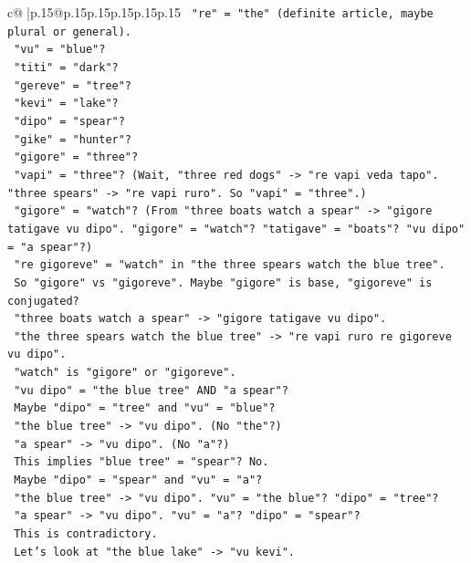 \documentclass{article}
\begin{document}
{\begin{supertabular}{c@{$\;$}|p{.15\linewidth}@{}p{.15\linewidth}p{.15\linewidth}p{.15\linewidth}p{.15\linewidth}p{.15\linewidth}}
{{{\texttt{    "re" = "the" (definite article, maybe plural or general).} \\
\texttt{    "vu" = "blue"?} \\
\texttt{    "titi" = "dark"?} \\
\texttt{    "gereve" = "tree"?} \\
\texttt{    "kevi" = "lake"?} \\
\texttt{    "dipo" = "spear"?} \\
\texttt{    "gike" = "hunter"?} \\
\texttt{    "gigore" = "three"?} \\
\texttt{    "vapi" = "three"? (Wait, "three red dogs" {-}> "re vapi veda tapo". "three spears" {-}> "re vapi ruro". So "vapi" = "three".)} \\
\texttt{    "gigore" = "watch"? (From "three boats watch a spear" {-}> "gigore tatigave vu dipo". "gigore" = "watch"? "tatigave" = "boats"? "vu dipo" = "a spear"?)} \\
\texttt{    "re gigoreve" = "watch" in "the three spears watch the blue tree".} \\
\texttt{    So "gigore" vs "gigoreve". Maybe "gigore" is base, "gigoreve" is conjugated?} \\
\texttt{    "three boats watch a spear" {-}> "gigore tatigave vu dipo".} \\
\texttt{    "the three spears watch the blue tree" {-}> "re vapi ruro re gigoreve vu dipo".} \\
\texttt{    "watch" is "gigore" or "gigoreve".} \\
\texttt{    "vu dipo" = "the blue tree" AND "a spear"?} \\
\texttt{    Maybe "dipo" = "tree" and "vu" = "blue"?} \\
\texttt{    "the blue tree" {-}> "vu dipo". (No "the"?)} \\
\texttt{    "a spear" {-}> "vu dipo". (No "a"?)} \\
\texttt{    This implies "blue tree" = "spear"? No.} \\
\texttt{    Maybe "dipo" = "spear" and "vu" = "a"?} \\
\texttt{    "the blue tree" {-}> "vu dipo". "vu" = "the blue"? "dipo" = "tree"?} \\
\texttt{    "a spear" {-}> "vu dipo". "vu" = "a"? "dipo" = "spear"?} \\
\texttt{    This is contradictory.} \\
\texttt{    Let's look at "the blue lake" {-}> "vu kevi".} \\
}}}
\end{supertabular}}
\end{document}
